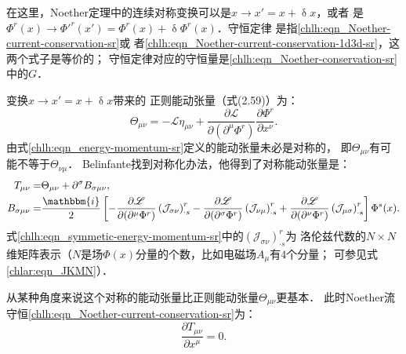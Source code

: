 在这里，Noether定理中的连续对称变换可以是$x \rightarrow x'=x+\updelta x$，或者
是$\Phi^r(x) \rightarrow\Phi'^r(x')= \Phi^r(x)+\updelta \Phi^r(x)$．守恒定律
是指\eqref{chlh:eqn_Noether-current-conservation-sr}或
者\eqref{chlh:eqn_Noether-current-conservation-1d3d-sr}，这两个式子是等价的；
守恒定律对应的守恒量是\eqref{chlh:eqn_Noether-conservation-sr}中的$G$．


变换$x \rightarrow x'=x+\updelta x$带来的
{\heiti 正则能动张量}（\parencite[\S 2.4]{Greiner-FQ-1996}式(2.59)）为：
\begin{equation}\label{chlh:eqn_energy-momentum-sr}
    \Theta_{\mu\nu} = -  \mathscr{L} \eta_{\mu\nu}  +   
    \frac{\partial \mathscr{L}}{\partial(\partial^{\mu}\Phi^{r})} 
    \frac{\partial \Phi^{r} }{\partial x^\nu}.
\end{equation}
由式\eqref{chlh:eqn_energy-momentum-sr}定义的能动张量未必是对称的，
即$\Theta_{\mu\nu}$有可能不等于$\Theta_{\nu\mu}$．
Belinfante找到对称化办法，他得到了{\heiti 对称能动张量}\parencite[\S 2.4,例2.1]{Greiner-FQ-1996}是：
\begin{align}
    T_{\mu\nu} =& \Theta_{\mu\nu} + \partial^{\sigma} B_{\sigma \mu\nu} ,
    \label{chlh:eqn_symmetic-energy-momentum-sr} \\
    B_{\sigma\mu\nu} =&\frac{\mathbbm{i}}{2}\left[ 
    -\frac{\partial \mathscr{L}}{\partial(\partial^{\mu}\Phi^{r})} \left( \mathcal{J}_{\sigma\nu}\right)^{r}_{\cdot s}  
    -\frac{\partial \mathscr{L}}{\partial(\partial^{\sigma}\Phi^{r})} \left( \mathcal{J}_{\nu\mu}\right)^{r}_{\cdot s}  
    +\frac{\partial \mathscr{L}}{\partial(\partial^{\nu}\Phi^{r})} \left( \mathcal{J}_{\mu\sigma}\right)^{r}_{\cdot s}  
    \right]\Phi^{s}(x) . \notag %
\end{align}
式\eqref{chlh:eqn_symmetic-energy-momentum-sr}中的$( \mathcal{J}_{\sigma\nu})^{r}_{\cdot s}  $为
洛伦兹代数的$N\times N$维矩阵表示（$N$是场$\Phi(x)$分量的个数，比如电磁场$A_\mu$有$4$个分量；
可参见式\eqref{chlar:eqn_JKMN}）．

从某种角度来说这个对称的能动张量比正则能动张量$\Theta_{\mu\nu}$更基本．
此时Noether流守恒\eqref{chlh:eqn_Noether-current-conservation-sr}为：
\begin{equation}\label{chlh:eqn_NC-Tab-sr}
    \frac{\partial T_{\mu\nu} }{\partial x^{\mu}} =0 .
\end{equation}


